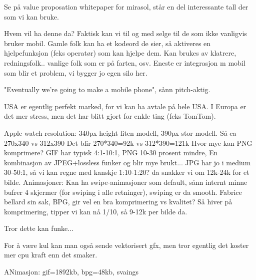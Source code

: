 Se på value proposation whitepaper for mirasol, står en del interessante tall
der som vi kan bruke.

Hvem vil ha denne da? Faktisk kan vi til og med selge til de som ikke vanligvis
bruker mobil. Gamle folk kan ha et kodeord de sier, så aktiveres en
hjelpefunksjon (feks operatør) som kan hjelpe dem. Kan brukes av klatrere,
redningsfolk.. vanlige folk som er på farten, osv. Eneste er integrasjon m
mobil som blir et problem, vi bygger jo egen silo her.

"Eventually we're going to make a mobile phone", sånn pitch-aktig.

USA er egentlig perfekt marked, for vi kan ha avtale på hele USA. I Europa er
det mer stress, men det har blitt gjort for enkle ting (feks TomTom).

Apple watch resolution: 340px height liten modell, 390px stor modell.
Så ca 270x340 vs 312x390
Det blir 270*340=92k vs 312*390=121k
Hvor mye kan PNG komprimere? GIF har typisk 4:1-10:1, PNG 10-30 prosent mindre,
En kombinasjon av JPEG+lossless funker og blir mye brukt... JPG har jo i medium
30-50:1, så vi kan regne med kanskje 1:10-1:20? da snakker vi om 12k-24k for et
bilde. Animasjoner: Kan ha swipe-animasjoner som default, sånn internt minne
bufrer 4 skjermer (for swiping i alle retninger), swiping er da smooth.
Fabrice bellard sin sak, BPG, gir vel en bra komprimering vs kvalitet?
Så hiver på komprimering, tipper vi kan nå 1/10, så 9-12k per bilde da.

Tror dette kan funke...

For å være kul kan man også sende vektorisert gfx, men tror egentlig det
koster mer cpu kraft enn det smaker.

ANimasjon: gif=1892kb, bpg=48kb, svaings
